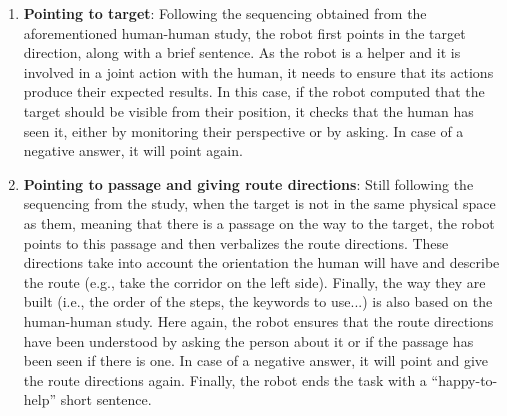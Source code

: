 \documentclass[a4paper,11pt,twoside]{StyleThese}
\begin{document}
\begin{enumerate}
	\item \textbf{Pointing to target}: Following the sequencing obtained from the aforementioned human-human study, the robot first points in the target direction, along with a brief sentence. As the robot is a helper and it is involved in a joint action with the human, it needs to ensure that its actions produce their expected results. In this case, if the robot computed that the target should be visible from their position, it checks that the human has seen it, either by monitoring their perspective or by asking. In case of a negative answer, it will point again.\label{steps:ensuring}
	\item \textbf{Pointing to passage and giving route directions}: Still following the sequencing from the study, when the target is not in the same physical space as them, meaning that there is a passage on the way to the target, the robot points to this passage and then verbalizes the route directions. These directions take into account the orientation the human will have and describe the route (e.g., take the corridor on the left side). Finally, the way they are built (i.e., the order of the steps, the keywords to use...) is also based on the human-human study. Here again, the robot ensures that the route directions have been understood by asking the person about it or if the passage has been seen if there is one.
	In case of a negative answer, it will point and give the route directions again. Finally, the robot ends the task with a ``happy-to-help'' short sentence.\label{steps:passage}
\end{enumerate}
\end{document}
